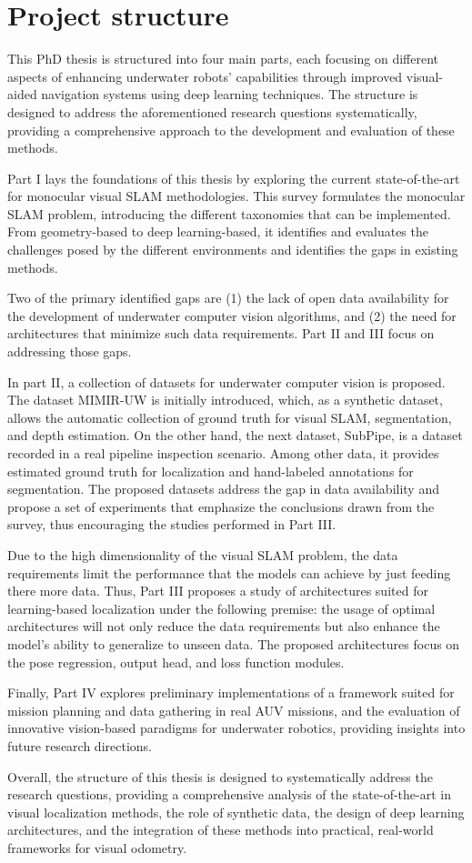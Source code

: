 \section{Project structure}

This PhD thesis is structured into four main parts, each focusing on different aspects of enhancing underwater robots' capabilities through improved visual-aided navigation systems using deep learning techniques. The structure is designed to address the aforementioned research questions systematically, providing a comprehensive approach to the development and evaluation of these methods.

Part I lays the foundations of this thesis by exploring the current state-of-the-art for monocular visual \ac{SLAM} methodologies. This survey formulates the monocular \ac{SLAM} problem, introducing the different taxonomies that can be implemented. From geometry-based to deep learning-based, it identifies and evaluates the challenges posed by the different environments and identifies the gaps in existing methods.

Two of the primary identified gaps are (1) the lack of open data availability for the development of underwater computer vision algorithms, and (2) the need for architectures that minimize such data requirements.
Part II and III focus on addressing those gaps.

In part II, a collection of datasets for underwater computer vision is proposed. The dataset MIMIR-UW is initially introduced, which, as a synthetic dataset, allows the automatic collection of ground truth for visual SLAM, segmentation, and depth estimation. On the other hand, the next dataset, SubPipe, is a dataset recorded in a real pipeline inspection scenario. Among other data, it provides estimated ground truth for localization and hand-labeled annotations for segmentation. The proposed datasets address the gap in data availability and propose a set of experiments that emphasize the conclusions drawn from the survey, thus encouraging the studies performed in Part III.

Due to the high dimensionality of the visual \ac{SLAM} problem, the data requirements limit the performance that the models can achieve by just feeding there more data. Thus, Part III proposes a study of architectures suited for learning-based localization under the following premise: the usage of optimal architectures will not only reduce the data requirements but also enhance the model's ability to generalize to unseen data. The proposed architectures focus on the pose regression, output head, and loss function modules.

Finally, Part IV explores preliminary implementations of a framework suited for mission planning and data gathering in real \ac{AUV} missions, and the evaluation of innovative vision-based paradigms for underwater robotics, providing insights into future research directions.

Overall, the structure of this thesis is designed to systematically address the research questions, providing a comprehensive analysis of the state-of-the-art in visual localization methods, the role of synthetic data, the design of deep learning architectures, and the integration of these methods into practical, real-world frameworks for visual odometry.
